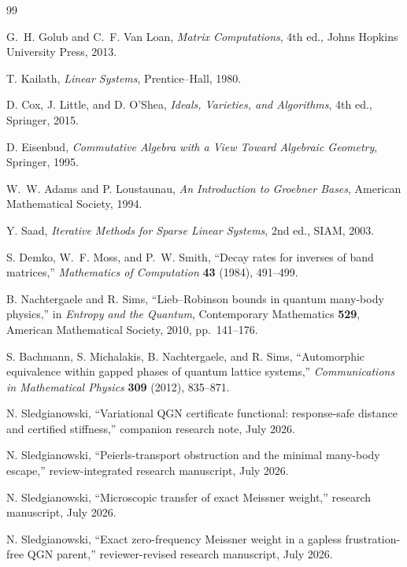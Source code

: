 \documentclass[11pt]{article}
\theoremstyle{definition}
\theoremstyle{remark}
\begin{document}
\begin{thebibliography}{99}

G.~H. Golub and C.~F. Van Loan,
\emph{Matrix Computations}, 4th ed., Johns Hopkins University Press, 2013.

T. Kailath,
\emph{Linear Systems}, Prentice--Hall, 1980.

D. Cox, J. Little, and D. O'Shea,
\emph{Ideals, Varieties, and Algorithms}, 4th ed., Springer, 2015.

D. Eisenbud,
\emph{Commutative Algebra with a View Toward Algebraic Geometry}, Springer, 1995.

W.~W. Adams and P. Loustaunau,
\emph{An Introduction to Groebner Bases}, American Mathematical Society, 1994.

Y. Saad,
\emph{Iterative Methods for Sparse Linear Systems}, 2nd ed., SIAM, 2003.

S. Demko, W.~F. Moss, and P.~W. Smith,
``Decay rates for inverses of band matrices,''
\emph{Mathematics of Computation} \textbf{43} (1984), 491--499.

B. Nachtergaele and R. Sims,
``Lieb--Robinson bounds in quantum many-body physics,''
in \emph{Entropy and the Quantum}, Contemporary Mathematics \textbf{529},
American Mathematical Society, 2010, pp.~141--176.

S. Bachmann, S. Michalakis, B. Nachtergaele, and R. Sims,
``Automorphic equivalence within gapped phases of quantum lattice systems,''
\emph{Communications in Mathematical Physics} \textbf{309} (2012), 835--871.

N. Sledgianowski,
``Variational QGN certificate functional: response-safe distance and certified stiffness,''
companion research note, July 2026.

N. Sledgianowski,
``Peierls-transport obstruction and the minimal many-body escape,''
review-integrated research manuscript, July 2026.

N. Sledgianowski,
``Microscopic transfer of exact Meissner weight,''
research manuscript, July 2026.

N. Sledgianowski,
``Exact zero-frequency Meissner weight in a gapless frustration-free QGN parent,''
reviewer-revised research manuscript, July 2026.

\end{thebibliography}
\end{document}
